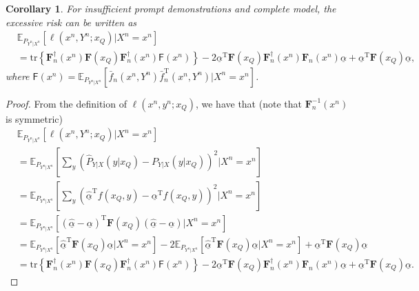 \documentclass{article} %
\theoremstyle{plain} %
\newtheorem{corollary}[theorem]{Corollary}
\begin{document}
\begin{corollary}\label{col:excessive_risk_insufficient}
For insufficient prompt demonstrations and complete model, the excessive risk can be written as
\begin{align*}
& \mathbb{E}_{P_{Y^n|X^n}}\left[ 
\ell \left(x^n,Y^n;x_Q\right) | X^n = x^n\right]\\
& = \mathrm{tr}\left\{ \mathbf{F}_n^{\dagger}(x^n)\mathbf{F}(x_Q)\mathbf{F}_n^{\dagger}(x^n) \mathsf{F}(x^n) \right\} - 2\underline{\alpha}^\mathrm{T}\mathbf{F}(x_Q)\mathbf{F}_n^{\dagger}(x^n)\mathbf{F}_n(x^n)\underline{\alpha} + \underline{\alpha}^{\mathrm{T}} \mathbf{F}(x_Q)\underline{\alpha}, 
\end{align*}
where $\mathsf{F}(x^n) = \mathbb{E}_{P_{Y^n|X^n}}\left[\bar{f}_n(x^n,Y^n) \bar{f}_n^\mathrm{T}(x^n,Y^n) | X^n=x^n\right]$.
\end{corollary}
\begin{proof}
    From the definition of $\ell \left(x^n,y^n;x_Q\right)$, we have that (note that $\mathbf{F}_n^{-1}(x^n)$ is symmetric)
\begin{align*}
&\mathbb{E}_{P_{Y^n|X^n}}\left[ 
\ell \left(x^n,Y^n;x_Q\right) | X^n = x^n\right]\\
& = \mathbb{E}_{P_{Y^n|X^n}}\left[ 
\sum_{y} \left(\hat{P}_{Y|X}(y|x_Q) -  P_{Y|X}(y|x_Q) \right)^2 | X^n = x^n\right]\\
& = \mathbb{E}_{P_{Y^n|X^n}}\left[ \sum_y \left( \underline{\hat{\alpha}}^\mathrm{T} f(x_Q,y) - \underline{\alpha}^\mathrm{T}f(x_Q,y) \right)^2 | X^n=x^n\right]\\
& = \mathbb{E}_{P_{Y^n|X^n}}\left[ \left(\underline{\hat{\alpha}} - \underline{\alpha}\right)^\mathrm{T} \mathbf{F}(x_Q) \left(\underline{\hat{\alpha}} - \underline{\alpha}\right) | X^n=x^n \right]\\
& = \mathbb{E}_{P_{Y^n|X^n}}\left[\underline{\hat{\alpha}}^{\mathrm{T}} \mathbf{F}(x_Q)\underline{\hat{\alpha}}| X^n=x^n\right] -2 \mathbb{E}_{P_{Y^n|X^n}}\left[\underline{\hat{\alpha}}^{\mathrm{T}} \mathbf{F}(x_Q)\underline{\alpha}| X^n=x^n\right] + \underline{\alpha}^{\mathrm{T}} \mathbf{F}(x_Q)\underline{\alpha} \\
& = \mathrm{tr}\left\{ \mathbf{F}_n^{\dagger}(x^n)\mathbf{F}(x_Q)\mathbf{F}_n^{\dagger}(x^n) \mathsf{F}(x^n) \right\}  - 2\underline{\alpha}^\mathrm{T}\mathbf{F}(x_Q)\mathbf{F}_n^{\dagger}(x^n)\mathbf{F}_n(x^n)\underline{\alpha} + \underline{\alpha}^{\mathrm{T}} \mathbf{F}(x_Q)\underline{\alpha}.
\end{align*}
\end{proof}
\end{document}
